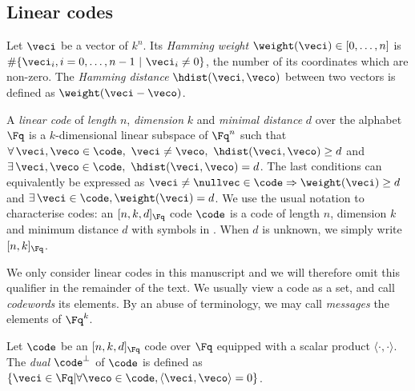 

\subsection{Linear codes}

\begin{defi}
Let $\veci$ be a vector of $k^n$. Its \emph{Hamming weight} $\weight(\veci) \in [0,\ldots,n]$ is $\#\{\veci_i, i = 0,\ldots,n-1~|~ \veci_i \neq 0\}$,
the number of its coordinates which are non-zero.
The \emph{Hamming distance} $\hdist(\veci,\veco)$ between two vectors is defined as $\weight(\veci - \veco)$.
\end{defi}


\begin{defi}
\label{def:lincode}
A \emph{linear code} of \emph{length} $n$, \emph{dimension} $k$ and \emph{minimal distance} $d$ over the alphabet $\Fq$ is a $k$-dimensional linear subspace of $\Fq^n$ such that
$\forall\,\veci, \veco \in \code,~ \veci \neq \veco,~\hdist(\veci, \veco) \geq d$
and $\exists\,\veci, \veco \in \code,~  \hdist(\veci, \veco) = d$.
The last conditions can equivalently be expressed as $\veci \neq \nullvec \in \code \Rightarrow \weight(\veci) \geq d$ and $\exists\,\veci \in \code, \weight(\veci) = d$.
We use the usual notation to characterise codes: an $[n, k, d]_{\Fq}$ code $\code$ is a code of length $n$, dimension $k$ and minimum distance $d$
with symbols in \Fq. When $d$ is unknown, we simply write $[n, k]_{\Fq}$.
\end{defi}

We only consider linear codes in this manuscript and we will therefore omit this qualifier in the remainder of the text. 
We usually view a code as a set, and call \emph{codewords} its elements. By an abuse of terminology, we may call \emph{messages} the elements of $\Fq^k$.

\begin{defi}
Let $\code$ be an $[n, k, d]_{\Fq}$ code over $\Fq$ equipped with a scalar product $\langle\cdot,\cdot\rangle$. The \emph{dual}
$\code^\bot$ of $\code$ is defined as $\{\veci \in \Fq | \forall \veco \in \code, \langle\veci,\veco\rangle = 0\}$.
\end{defi}

